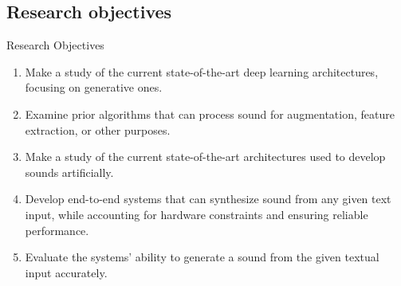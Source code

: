\subsection{Research objectives}

\begin{frame}{Research Objectives}
    \begin{enumerate}
        \item Make a study of the current state-of-the-art deep learning architectures, focusing on generative ones.
        \item Examine prior algorithms that can process sound for augmentation, feature extraction, or other purposes.
        \item Make a study of the current state-of-the-art architectures used to develop sounds artificially.
        \item Develop end-to-end systems that can synthesize sound from any given text input, while accounting for hardware constraints and ensuring reliable performance.
        \item Evaluate the systems’ ability to generate a sound from the given textual input accurately.
    \end{enumerate}
\end{frame}